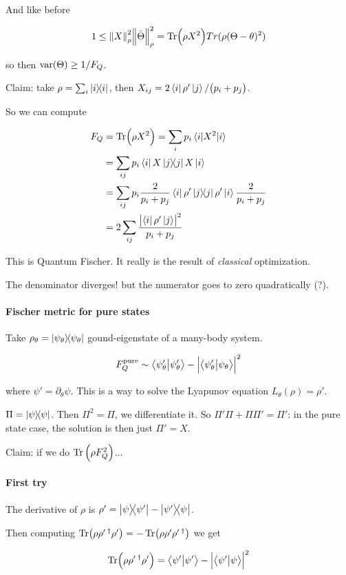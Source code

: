 And like before

\begin{equation}
  1 \leq \norm{X}^{2} _{\rho}  \norm{\bar{\Theta}}^{2} _{\rho}
  = \Tr (\rho X^2 ) Tr(\rho (\Theta - \theta)^2)
\end{equation}

so then \( \text{var} \qty(\Theta) \geq 1/F_Q \).

Claim: take \( \rho = \sum_i \ketbra{i} \), then \( X _{ij} = 2\bra{i}\rho' \ket{j}/\qty(p_i + p_j) \).

So we can compute

\begin{align}
  F_Q &= \Tr(\rho X^2) = \sum_i p_i \ev{X^2}{i}  \\
  &= \sum _{ij} p_i \bra{i} X \ketbra{j} X \ket{i}  \\
  &= \sum _{ij} p_i \frac{2}{p_i + p_j} \bra{i} \rho' \ketbra{j} \rho' \ket{i} \frac{2}{p_i + p_j}  \\
  &= 2 \sum _{ij} \frac{\abs{\bra{i} \rho' \ket{j}}^2 }{p_i + p_j}
\end{align}

This is Quantum Fischer. It really is the result of \emph{classical} optimization.

The denominator diverges! but the numerator goes to zero quadratically (?).

\paragraph{Fischer metric for pure states}

Take \( \rho_\theta = \ketbra{\psi_\theta} \) gound-eigenstate of a many-body system.

\begin{equation}
  F_Q ^{\text{pure}} \sim \braket{\psi_\theta'}{\psi_\theta'} - \abs{\braket{\psi_\theta'}{\psi_\theta}}^2
\end{equation}

where \( \psi' = \partial_\theta \psi \). This is a way to solve the Lyapunov equation \( L_\theta (\rho) = \rho' \).

\( \Pi = \ketbra{\psi} \). Then \(\Pi ^2 = \Pi\), we differentiate it.
So \( \Pi' \Pi + \Pi \Pi' = \Pi' \): in the pure state case, the solution is then just \( \Pi ' = X \).

Claim: if we do \( \Tr \qty(\rho F_Q^2)\)...

\paragraph{First try}

The derivative of \( \rho \) is \( \rho' = \ketbra{\psi}{\psi'} - \ketbra{\psi'}{\psi} \).

Then computing \( \Tr(\rho \rho'\, ^\dag \rho') = - \Tr(\rho \rho' \rho'\, ^\dag)\) we get

\begin{equation}
  \Tr(\rho \rho'\, ^\dag \rho') = \braket{\psi'}{\psi'} - \abs{\braket{\psi'}{\psi}}^2
\end{equation}
